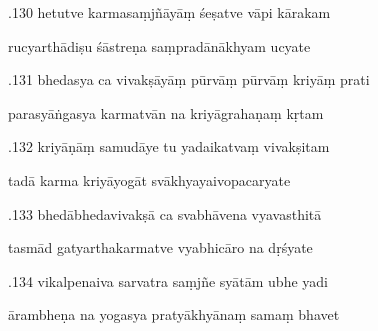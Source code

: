 \documentclass[article,12pt,a4paper]{memoir}%
\newcounter{parCount}
\begin{document}
	  
	  \pstart {}.130 hetutve karmasaṃjñāyāṃ śeṣatve vāpi kārakam 
	{}
	\pend%
      

	  
	  \pstart \leavevmode%
	rucyarthādiṣu śāstreṇa saṃpradānākhyam ucyate 
	{}
	\pend%
      

	  
	  \pstart {}.131 bhedasya ca vivakṣāyāṃ pūrvāṃ pūrvāṃ kriyāṃ prati 
	{}
	\pend%
      

	  
	  \pstart \leavevmode%
	parasyāṅgasya karmatvān na kriyāgrahaṇaṃ kṛtam 
	{}
	\pend%
      

	  
	  \pstart {}.132 kriyāṇāṃ samudāye tu yadaikatvaṃ vivakṣitam 
	{}
	\pend%
      

	  
	  \pstart \leavevmode%
	tadā karma kriyāyogāt svākhyayaivopacaryate 
	{}
	\pend%
      

	  
	  \pstart {}.133 bhedābhedavivakṣā ca svabhāvena vyavasthitā 
	{}
	\pend%
      

	  
	  \pstart \leavevmode%
	tasmād gatyarthakarmatve vyabhicāro na dṛśyate 
	{}
	\pend%
      

	  
	  \pstart {}.134 vikalpenaiva sarvatra saṃjñe syātām ubhe yadi 
	{}
	\pend%
      

	  
	  \pstart \leavevmode%
	ārambheṇa na yogasya pratyākhyānaṃ samaṃ bhavet 
	{}
	\pend%
      
\end{document}
